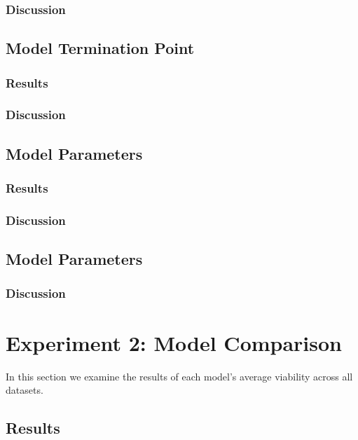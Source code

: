 \documentclass[12pt,a4paper]{report}
\begin{document}
\subsubsection{Discussion}

\subsection{Model Termination Point}
\subsubsection{Results}

\subsubsection{Discussion}

\subsection{Model Parameters}
\subsubsection{Results}

\subsubsection{Discussion}

\subsection{Model Parameters}
\subsubsection{Discussion}




\section{Experiment 2: Model Comparison}
\label{sec:overall}
In this section we examine the results of each model's average viability across all datasets. 
\subsection{Results}

\end{document}
